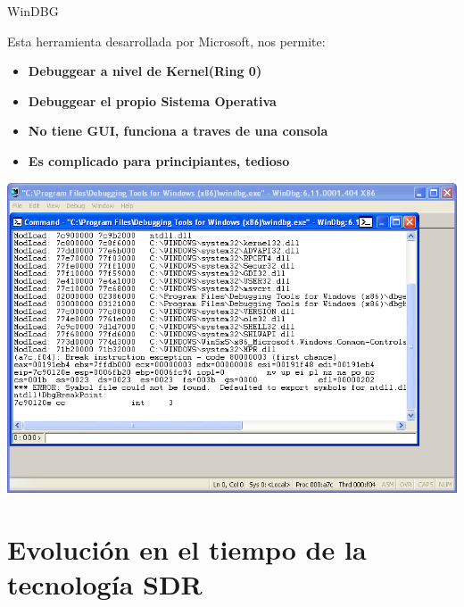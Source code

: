 \documentclass{beamer}
\begin{document}
\begin{frame}{WinDBG}

Esta herramienta desarrollada por Microsoft, nos permite:
\begin{itemize}
\item \textbf{Debuggear a nivel de Kernel(Ring 0)}
\item \textbf{Debuggear el propio Sistema Operativa}
\item \textbf{No tiene GUI, funciona a traves de una consola}
\item \textbf{Es complicado para principiantes, tedioso}
\end{itemize}
\begin{center}
\includegraphics[scale=0.21]{windbg.png}
\end{center}

\end{frame}

\section{Evolución en el tiempo de la tecnología SDR}
\end{document}
